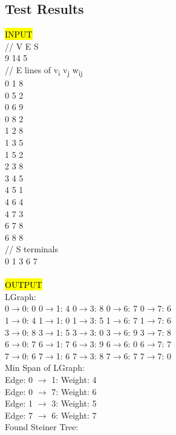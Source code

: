 \documentclass[a4paper]{article}
\begin{document}
\subsection{Test Results}
\hl{INPUT}\\
// V E S\\
9 14 5\\
// E lines of v\textsubscript{i} v\textsubscript{j} w\textsubscript{ij}\\
0 1 8\\
0 5 2\\
0 6 9\\
0 8 2\\
1 2 8\\
1 3 5\\
1 5 2\\
2 3 8\\
3 4 5\\
4 5 1\\
4 6 4\\
4 7 3\\
6 7 8\\
6 8 8\\
// S terminals\\
0 1 3 6 7\\
\\
\hl{OUTPUT}\\
LGraph:\\
0$\rightarrow$0: 0       0$\rightarrow$1: 4       0$\rightarrow$3: 8       0$\rightarrow$6: 7       0$\rightarrow$7: 6\\
1$\rightarrow$0: 4       1$\rightarrow$1: 0       1$\rightarrow$3: 5       1$\rightarrow$6: 7       1$\rightarrow$7: 6\\
3$\rightarrow$0: 8       3$\rightarrow$1: 5       3$\rightarrow$3: 0       3$\rightarrow$6: 9       3$\rightarrow$7: 8\\
6$\rightarrow$0: 7       6$\rightarrow$1: 7       6$\rightarrow$3: 9       6$\rightarrow$6: 0       6$\rightarrow$7: 7\\
7$\rightarrow$0: 6       7$\rightarrow$1: 6       7$\rightarrow$3: 8       7$\rightarrow$6: 7       7$\rightarrow$7: 0\\
Min Span of LGraph:\\
Edge: 0 $\rightarrow$ 1: Weight: 4\\
Edge: 0 $\rightarrow$ 7: Weight: 6\\
Edge: 1 $\rightarrow$ 3: Weight: 5\\
Edge: 7 $\rightarrow$ 6: Weight: 7\\
Found Steiner Tree:\\
\end{document}
